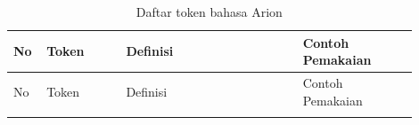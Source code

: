 \begin{center}
    \small
    \setlength{\extrarowheight}{2pt}
    \begin{longtable}{p{0.06\linewidth} p{0.18\linewidth} p{0.40\linewidth} p{0.26\linewidth}}
        \caption{Daftar token bahasa Arion}                                                                                                                                             \\
        \toprule
        No & Token       & Definisi                                                                                                                    & Contoh Pemakaian               \\
        \midrule
        \endfirsthead
        \toprule
        No & Token       & Definisi                                                                                                                    & Contoh Pemakaian               \\
        \midrule
        \endhead
        \bottomrule
        \endfoot


\end{longtable}
\end{center}
